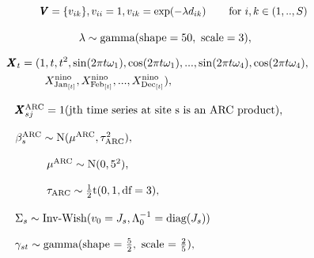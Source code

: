 \documentclass[12pt]{article}
\def\bX{\pmb{X}}
\def\bV{\pmb{V}}
\begin{document}
$\hspace{1.7in}
\bV=\{v_{ik}\}, v_{ii}=1, v_{ik} = \exp(-\lambda d_{ik}) \hspace{0.3in} \text{for $i,k \in (1,..,S)$}
$

$\hspace{2.1in}
\lambda \sim \text{gamma}(\text{shape} = 50, \text{ scale} = 3),
$


\vspace{-0.4in}
\begin{align*}
\hspace{1.2in}
\bX_t &= (1, t, t^2, \sin(2\pi t \omega_1), \cos(2\pi t \omega_1),..., \sin(2\pi t \omega_4), \cos(2\pi t \omega_4), \\
& \hspace{0.3in} X^\text{nino}_{\text{Jan}_{[t]}}, X^\text{nino}_{\text{Feb}_{[t]}}, ..., X^\text{nino}_{\text{Dec}_{[t]}}),
\end{align*}

\vspace{-0.2in}
$\hspace{1.3in}
\bX^\text{ARC}_{sj} = 1(\text{jth time series at site s is an ARC product}),
$

$\hspace{1.3in}
\beta^\text{ARC}_s \sim \text{N}(\mu^\text{ARC}, \tau^2_\text{ARC}),
$

$\hspace{1.7in}
\mu^\text{ARC} \sim \text{N}(0, 5^2),
$

$\hspace{1.7in}
\tau_\text{ARC} \sim \frac{1}{2}\text{t}(0, 1, \text{df} = 3),
$

$\hspace{1.3in}
\Sigma_s \sim \text{Inv-Wish}(v_0 = J_s, \Lambda_0^{-1} = \text{diag}(J_s))
$

$\hspace{1.3in}
\gamma_{st} \sim \text{gamma}(\text{shape = } \frac{5}{2}, \text{ scale = } \frac{2}{5}),
$
\end{document}
